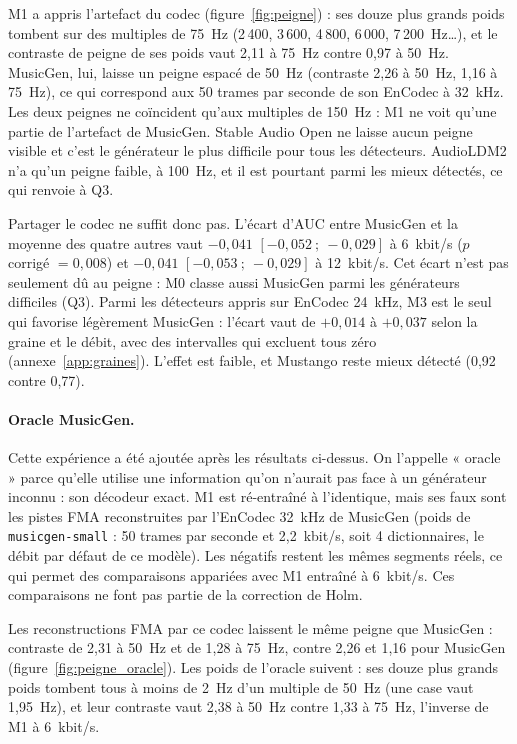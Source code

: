 \documentclass[a4paper, 11pt]{article}
\begin{document}
M1 a appris l'artefact du codec (figure~\ref{fig:peigne}) : ses douze plus grands poids tombent sur des
multiples de 75~Hz (2\,400, 3\,600, 4\,800, 6\,000, 7\,200~Hz\dots), et le contraste de peigne de ses poids vaut
2,11 à 75~Hz contre 0,97 à 50~Hz. MusicGen, lui, laisse un peigne espacé de 50~Hz (contraste 2,26 à 50~Hz, 1,16
à 75~Hz), ce qui correspond aux 50 trames par seconde de son EnCodec à 32~kHz. Les deux peignes ne
coïncident qu'aux multiples de 150~Hz : M1 ne voit qu'une partie de l'artefact de MusicGen. Stable Audio Open ne
laisse aucun peigne visible et c'est le générateur le plus difficile pour tous les détecteurs. AudioLDM2 n'a
qu'un peigne faible, à 100~Hz, et il est pourtant parmi les mieux détectés, ce qui renvoie à Q3.

Partager le codec ne suffit donc pas. L'écart d'AUC entre MusicGen et la moyenne des quatre autres vaut
$-0{,}041$ $[-0{,}052~;~-0{,}029]$ à 6~kbit/s ($p$ corrigé $= 0{,}008$) et $-0{,}041$
$[-0{,}053~;~-0{,}029]$ à 12~kbit/s. Cet écart n'est pas seulement dû au peigne : M0 classe aussi MusicGen
parmi les générateurs difficiles (Q3). Parmi les détecteurs appris sur EnCodec 24~kHz, M3 est le seul qui
favorise légèrement MusicGen : l'écart vaut de $+0{,}014$ à $+0{,}037$ selon la graine et le débit, avec des
intervalles qui excluent tous zéro (annexe~\ref{app:graines}). L'effet est faible, et Mustango reste mieux
détecté (0,92 contre 0,77).

\paragraph{Oracle MusicGen.} Cette expérience a été ajoutée après les résultats ci-dessus. On l'appelle
« oracle » parce qu'elle utilise une information qu'on n'aurait pas face à un générateur inconnu : son décodeur
exact. M1 est ré-entraîné à l'identique, mais ses faux sont les pistes FMA reconstruites par l'EnCodec 32~kHz
de MusicGen (poids de \texttt{musicgen-small} : 50 trames par seconde et 2,2~kbit/s, soit 4 dictionnaires, le
débit par défaut de ce modèle). Les négatifs restent les mêmes segments réels, ce qui permet des comparaisons
appariées avec M1 entraîné à 6~kbit/s. Ces comparaisons ne font pas partie de la correction de Holm.

Les reconstructions FMA par ce codec laissent le même peigne que MusicGen : contraste de 2,31 à 50~Hz et de
1,28 à 75~Hz, contre 2,26 et 1,16 pour MusicGen (figure~\ref{fig:peigne_oracle}). Les poids de l'oracle
suivent : ses douze plus grands poids tombent tous à moins de 2~Hz d'un multiple de 50~Hz (une case vaut
1,95~Hz), et leur contraste vaut 2,38 à 50~Hz contre 1,33 à 75~Hz, l'inverse de M1 à 6~kbit/s.
\end{document}
